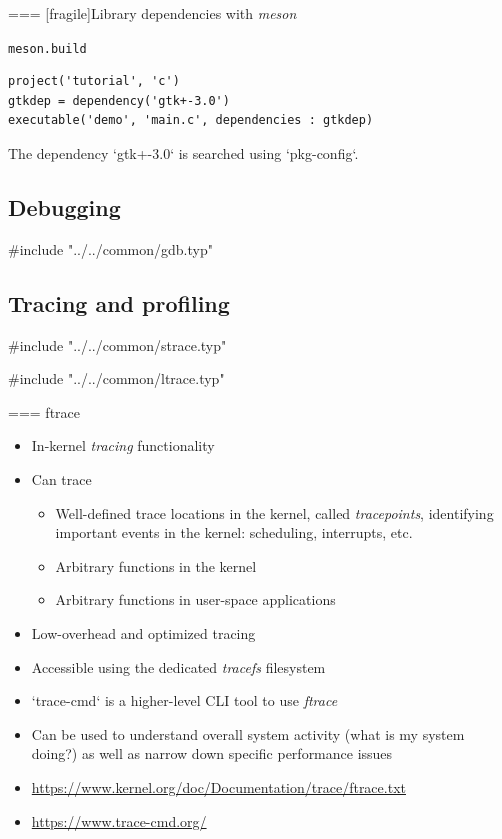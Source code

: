 === [fragile]{Library dependencies with {\em meson}}
  \begin{block}{{\tt meson.build}}
\begin{verbatim}
project('tutorial', 'c')
gtkdep = dependency('gtk+-3.0')
executable('demo', 'main.c', dependencies : gtkdep)
\end{verbatim}
  \end{block}
  The dependency `gtk+-3.0` is searched using `pkg-config`.


\subsection{Debugging}

#include "../../common/gdb.typ"


\subsection{Tracing and profiling}

#include "../../common/strace.typ"

#include "../../common/ltrace.typ"


=== {ftrace}
  \begin{itemize}
  \item In-kernel {\em tracing} functionality
  \item Can trace
    \begin{itemize}
    \item Well-defined trace locations in the kernel, called {\em
        tracepoints}, identifying important events in the kernel:
      scheduling, interrupts, etc.
    \item Arbitrary functions in the kernel
    \item Arbitrary functions in user-space applications
    \end{itemize}
  \item Low-overhead and optimized tracing
  \item Accessible using the dedicated {\em tracefs} filesystem
  \item `trace-cmd` is a higher-level CLI tool to use {\em
      ftrace}
  \item Can be used to understand overall system activity (what is my
    system doing?) as well as narrow down specific performance
    issues
  \item \url{https://www.kernel.org/doc/Documentation/trace/ftrace.txt}
  \item \url{https://www.trace-cmd.org/}
  \end{itemize}


